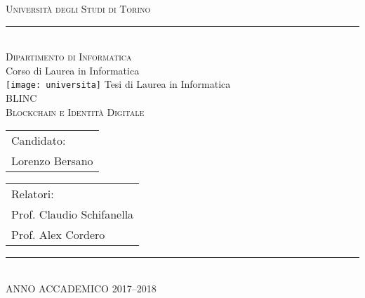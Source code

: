 \thispagestyle{empty}
\setcounter{page}{0}

\begin{center}
\Large
\textsc{Università degli Studi di Torino}\\
\vspace{-0.4cm}
\rule{\textwidth}{0.1mm}\\
\large
\textsc{Dipartimento di Informatica}\\ 
\bigskip
Corso di Laurea in Informatica \\
\vfill
\texttt{[image: universita]}
\vfill %
Tesi di Laurea in Informatica \\
\vfill %
\Large
\textsc{BLINC}\\
\textsc{Blockchain e Identità Digitale}
\end{center}
\vfill
\begin{tabular}[t]{l}
Candidato:\\
Lorenzo Bersano
\end{tabular}
\hfill 
\begin{tabular}[t]{l}
Relatori: \\
Prof. Claudio Schifanella \\
Prof. Alex Cordero
\end{tabular}
\vfill
\begin{center}
\normalsize
\rule{8cm}{0.1mm}\\
\bigskip
ANNO ACCADEMICO 2017--2018
\end{center}
